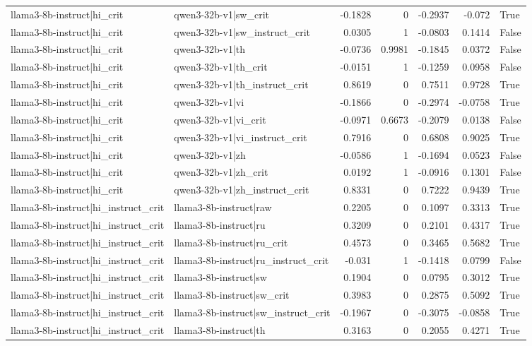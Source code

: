 \begin{table}
\begin{tabular}{l l r r r r l}
llama3-8b-instruct|hi_crit & qwen3-32b-v1|sw_crit & -0.1828 & 0 & -0.2937 & -0.072 & True \\
llama3-8b-instruct|hi_crit & qwen3-32b-v1|sw_instruct_crit & 0.0305 & 1 & -0.0803 & 0.1414 & False \\
llama3-8b-instruct|hi_crit & qwen3-32b-v1|th & -0.0736 & 0.9981 & -0.1845 & 0.0372 & False \\
llama3-8b-instruct|hi_crit & qwen3-32b-v1|th_crit & -0.0151 & 1 & -0.1259 & 0.0958 & False \\
llama3-8b-instruct|hi_crit & qwen3-32b-v1|th_instruct_crit & 0.8619 & 0 & 0.7511 & 0.9728 & True \\
llama3-8b-instruct|hi_crit & qwen3-32b-v1|vi & -0.1866 & 0 & -0.2974 & -0.0758 & True \\
llama3-8b-instruct|hi_crit & qwen3-32b-v1|vi_crit & -0.0971 & 0.6673 & -0.2079 & 0.0138 & False \\
llama3-8b-instruct|hi_crit & qwen3-32b-v1|vi_instruct_crit & 0.7916 & 0 & 0.6808 & 0.9025 & True \\
llama3-8b-instruct|hi_crit & qwen3-32b-v1|zh & -0.0586 & 1 & -0.1694 & 0.0523 & False \\
llama3-8b-instruct|hi_crit & qwen3-32b-v1|zh_crit & 0.0192 & 1 & -0.0916 & 0.1301 & False \\
llama3-8b-instruct|hi_crit & qwen3-32b-v1|zh_instruct_crit & 0.8331 & 0 & 0.7222 & 0.9439 & True \\
llama3-8b-instruct|hi_instruct_crit & llama3-8b-instruct|raw & 0.2205 & 0 & 0.1097 & 0.3313 & True \\
llama3-8b-instruct|hi_instruct_crit & llama3-8b-instruct|ru & 0.3209 & 0 & 0.2101 & 0.4317 & True \\
llama3-8b-instruct|hi_instruct_crit & llama3-8b-instruct|ru_crit & 0.4573 & 0 & 0.3465 & 0.5682 & True \\
llama3-8b-instruct|hi_instruct_crit & llama3-8b-instruct|ru_instruct_crit & -0.031 & 1 & -0.1418 & 0.0799 & False \\
llama3-8b-instruct|hi_instruct_crit & llama3-8b-instruct|sw & 0.1904 & 0 & 0.0795 & 0.3012 & True \\
llama3-8b-instruct|hi_instruct_crit & llama3-8b-instruct|sw_crit & 0.3983 & 0 & 0.2875 & 0.5092 & True \\
llama3-8b-instruct|hi_instruct_crit & llama3-8b-instruct|sw_instruct_crit & -0.1967 & 0 & -0.3075 & -0.0858 & True \\
llama3-8b-instruct|hi_instruct_crit & llama3-8b-instruct|th & 0.3163 & 0 & 0.2055 & 0.4271 & True \\

\end{tabular}
\end{table}
